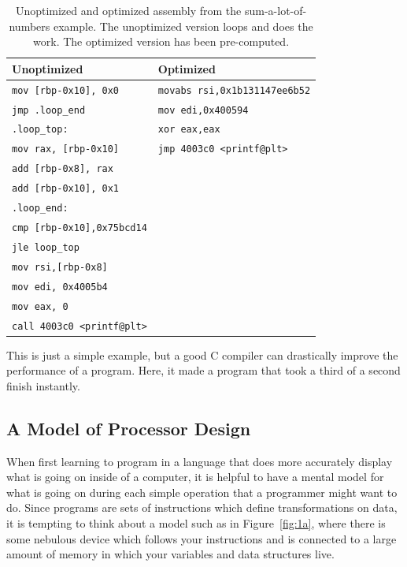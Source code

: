 \begin{table}[h]
	\centering
\begin{tabular}{l | l}
	\hline
	\textbf{Unoptimized} & \textbf{Optimized}\\
	\hline
	\texttt{mov [rbp-0x10], 0x0}	&\texttt{movabs rsi,0x1b131147ee6b52} \\
	\texttt{jmp .loop\_end			}	&\texttt{mov edi,0x400594} \\
	\texttt{.loop\_top:                } &\texttt{xor eax,eax   } \\
	\texttt{mov rax, [rbp-0x10]				}	&\texttt{jmp 4003c0 <printf@plt>}\\
	\texttt{add [rbp-0x8], rax				}	&\texttt{	} \\
	\texttt{add [rbp-0x10], 0x1				}	&\texttt{ }\\	
	\texttt{.loop\_end:                       } &\texttt{} \\
	\texttt{cmp [rbp-0x10],0x75bcd14} &\texttt{} \\
	\texttt{jle loop\_top} &\texttt{} \\
	\texttt{mov rsi,[rbp-0x8]} &\texttt{} \\
	\texttt{mov edi, 0x4005b4} &\texttt{} \\
	\texttt{mov eax, 0} &\texttt{} \\
	\texttt{call 4003c0 <printf@plt>} &\texttt{} \\
\end{tabular}
	\caption[Unoptimized and optimized assembly from the sum-a-lot-of-numbers example.]{Unoptimized and optimized assembly from the sum-a-lot-of-numbers example. The unoptimized version loops and does the work. The optimized version has been pre-computed.}
	\label{table:assem-1}
\end{table}

This is just a simple example, but a good C compiler can drastically improve the performance of a
program. Here, it made a program that took a third of a second finish instantly.

\subsection{A Model of Processor Design}

When first learning to program in a language that does more accurately display what is going on
inside of a computer, it is helpful to have a mental model for what is going on during each
simple operation that a programmer might want to do. Since programs are sets of instructions
which define transformations on data, it is tempting to think about a model such as in Figure~\ref{fig:1a},
where there is some nebulous device which follows your instructions and is connected to a large amount
of memory in which your variables and data structures live.

